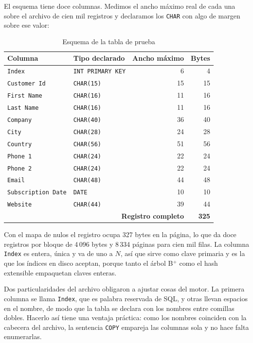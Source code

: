 \documentclass[a4paper,12pt]{article}
\begin{document}
El esquema tiene doce columnas. Medimos el ancho máximo real de cada una sobre
el archivo de cien mil registros y declaramos los \texttt{CHAR} con algo de
margen sobre ese valor:

\begin{table}[H]
\centering
\caption{Esquema de la tabla de prueba}
\begin{tabular}{@{}llrr@{}}
\toprule
\textbf{Columna} & \textbf{Tipo declarado} & \textbf{Ancho máximo} & \textbf{Bytes} \\
\midrule
\texttt{Index} & \texttt{INT PRIMARY KEY} & 6 & 4 \\
\texttt{Customer Id} & \texttt{CHAR(15)} & 15 & 15 \\
\texttt{First Name} & \texttt{CHAR(16)} & 11 & 16 \\
\texttt{Last Name} & \texttt{CHAR(16)} & 11 & 16 \\
\texttt{Company} & \texttt{CHAR(40)} & 36 & 40 \\
\texttt{City} & \texttt{CHAR(28)} & 24 & 28 \\
\texttt{Country} & \texttt{CHAR(56)} & 51 & 56 \\
\texttt{Phone 1} & \texttt{CHAR(24)} & 22 & 24 \\
\texttt{Phone 2} & \texttt{CHAR(24)} & 22 & 24 \\
\texttt{Email} & \texttt{CHAR(48)} & 44 & 48 \\
\texttt{Subscription Date} & \texttt{DATE} & 10 & 10 \\
\texttt{Website} & \texttt{CHAR(44)} & 39 & 44 \\
\midrule
\multicolumn{3}{r}{\textbf{Registro completo}} & \textbf{325} \\
\bottomrule
\end{tabular}
\end{table}

Con el mapa de nulos el registro ocupa 327 bytes en la página, lo que da doce
registros por bloque de 4\,096 bytes y 8\,334 páginas para cien mil filas. La
columna \texttt{Index} es entera, única y va de uno a $N$, así que sirve como
clave primaria y es la que los índices en disco aceptan, porque tanto el árbol
B$^+$ como el hash extensible empaquetan claves enteras.

Dos particularidades del archivo obligaron a ajustar cosas del motor. La primera
columna se llama \texttt{Index}, que es palabra reservada de SQL, y otras llevan
espacios en el nombre, de modo que la tabla se declara con los nombres entre
comillas dobles. Hacerlo así tiene una ventaja práctica: como los nombres
coinciden con la cabecera del archivo, la sentencia \texttt{COPY} empareja las
columnas sola y no hace falta enumerarlas.
\end{document}
